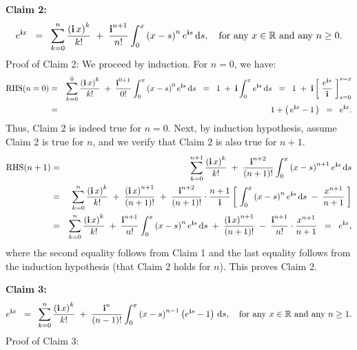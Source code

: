 \vskip 0.5cm

\begin{center}
\begin{minipage}{6.5in}
\noindent
\textbf{Claim 2:}
\begin{equation*}
e^{\textnormal{\bf i} x}
\;\;=\;\;
\sum_{k=0}^{n}\dfrac{\left(\textnormal{\bf i}\,x\right)^{k}}{k!}
\;+\; \dfrac{\textnormal{\bf i}^{n+1}}{n!}\int_{0}^{x}\left(x-s\right)^{n}e^{\textnormal{\bf i} s}\,\textnormal{d} s,
\quad
\textnormal{for any $x \in \mathbb{R}$ and any $n \geq 0$.}
\end{equation*}
Proof of Claim 2: We proceed by induction.
For $n = 0$, we have:
\begin{eqnarray*}
\textnormal{RHS}(n=0)
&=&
\sum_{k=0}^{0}\dfrac{\left(\textnormal{\bf i}\,x\right)^{k}}{k!}
\;+\; \dfrac{\textnormal{\bf i}^{0+1}}{0!}\int_{0}^{x}\left(x-s\right)^{0}e^{\textnormal{\bf i} s}\,\textnormal{d} s
\;\;=\;\; 1 \;+\; \textnormal{\bf i}\int_{0}^{x} e^{\textnormal{\bf i} s}\,\textnormal{d} s
\;\;=\;\; 1 \;+\; \textnormal{\bf i}\left[\;\dfrac{e^{\textnormal{\bf i} s}}{\textnormal{\bf i}}\;\right]_{s=0}^{s=x}
\\
&=& 1 + \left(\,e^{\textnormal{\bf i} x} - 1\,\right) \;\;=\;\; e^{\textnormal{\bf i} x}.
\end{eqnarray*}
Thus, Claim 2 is indeed true for $n = 0$.
Next, by induction hypothesis, assume Claim 2 is true for $n$,
and we verify that Claim 2 is also true for $n+1$.
\begin{eqnarray*}
\textnormal{RHS}(n+1)
&=& \sum_{k=0}^{n+1}\dfrac{\left(\textnormal{\bf i}\,x\right)^{k}}{k!} \;+\; \dfrac{\textnormal{\bf i}^{n+2}}{(n+1)!}\int_{0}^{x}\left(x-s\right)^{n+1}e^{\textnormal{\bf i} s}\,\textnormal{d} s
\\
&=&
\sum_{k=0}^{n}\dfrac{\left(\textnormal{\bf i}\,x\right)^{k}}{k!}
\;+\; \dfrac{\left(\textnormal{\bf i}\,x\right)^{n+1}}{(n+1)!}
\;+\; \dfrac{\textnormal{\bf i}^{n+2}}{(n+1)!}\cdot\dfrac{n+1}{\textnormal{\bf i}}\left[\;\int_{0}^{x}\left(x-s\right)^{n}e^{\textnormal{\bf i} s}\,\textnormal{d} s \;-\; \dfrac{x^{n+1}}{n+1} \;\right]
\\
&=& 
\sum_{k=0}^{n}\dfrac{\left(\textnormal{\bf i}\,x\right)^{k}}{k!}
\;+\; \dfrac{\textnormal{\bf i}^{n+1}}{n!}\int_{0}^{x}\left(x-s\right)^{n}e^{\textnormal{\bf i} s}\,\textnormal{d} s
\;+\; \dfrac{\left(\textnormal{\bf i}\,x\right)^{n+1}}{(n+1)!}
\;-\; \dfrac{\textnormal{\bf i}^{n+1}}{n!}\cdot\dfrac{x^{n+1}}{n+1}
\;\;=\;\; e^{\textnormal{\bf i} x},
\end{eqnarray*}
where the second equality follows from Claim 1 and the last equality follows from the induction hypothesis (that Claim 2 holds for $n$).
This proves Claim 2.
\end{minipage}
\end{center}

\vskip 0.5cm

\begin{center}
\begin{minipage}{6.5in}
\noindent
\textbf{Claim 3:}
\begin{equation*}
e^{\textnormal{\bf i} x}
\;\;=\;\;
\sum_{k=0}^{n}\dfrac{\left(\textnormal{\bf i}\,x\right)^{k}}{k!}
\;+\; \dfrac{\textnormal{\bf i}^{n}}{(n-1)!}\int_{0}^{x}\left(x-s\right)^{n-1}\left(e^{\textnormal{\bf i} s}-1\right)\,\textnormal{d} s,
\quad
\textnormal{for any $x \in \mathbb{R}$ and any $n \geq 1$.}
\end{equation*}
Proof of Claim 3:
\end{minipage}
\end{center}

